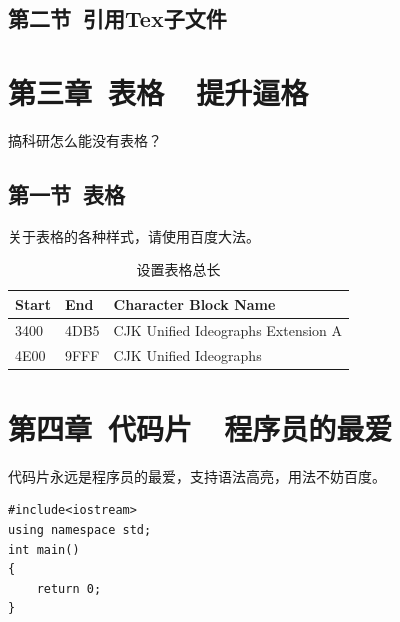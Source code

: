 \documentclass{ctexart}
\begin{document}
\subsection{第二节\ 引用Tex子文件}






\clearpage
\section{第三章\ 表格\ \ 提升逼格}

搞科研怎么能没有表格？\\

\subsection{第一节\ 表格}

关于表格的各种样式，请使用百度大法。\\
\begin{table}[H]
\caption{设置表格总长} 
\begin{tabular*}{12cm}{lll}
\hline  
Start & End  & Character Block Name \\  
\hline  
3400  & 4DB5 & CJK Unified Ideographs Extension A \\  
4E00  & 9FFF & CJK Unified Ideographs \\  
\hline  
\end{tabular*} 
\end{table} 



\section{第四章\ 代码片\ \ 程序员的最爱}
代码片永远是程序员的最爱，支持语法高亮，用法不妨百度。\\
\lstset{language=C}
\begin{lstlisting}
#include<iostream>
using namespace std;
int main()
{
    return 0;
}
\end{lstlisting}
\end{document}
